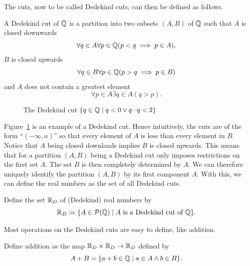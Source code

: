 \documentclass[../main.tex]{subfiles}
\begin{document}
The cuts, now to be called Dedekind cuts, can then be defined as follows.
\begin{definition}
    A Dedekind cut of $\mathbb{Q}$ is a partition into two subsets $(A,B)$ of $\mathbb{Q}$ such that $A$ is closed downwards
    \begin{equation*}
        \forall q\in A\forall p\in\mathbb{Q}(p<q\implies p\in A),
    \end{equation*}
    $B$ is closed upwards
    \begin{equation*}
        \forall q\in B\forall p\in\mathbb{Q}(p>q\implies p\in B)
    \end{equation*}
    and $A$ does not contain a greatest element
    \begin{equation*}
        \forall p\in A\exists q\in A(q>p).
    \end{equation*}
\end{definition}
\begin{figure}[!htbp]
    \centering
    
    \caption{The Dedekind cut $\{q\in\mathbb{Q}\mid q<0\lor q\cdot q<2\}$}
    \label{fig:the_real_numbers:dedekind_cut}
\end{figure}
Figure~\ref{fig:the_real_numbers:dedekind_cut} is an example of a Dedekind cut. Hence intuitively, the cuts are of the form ``$(-\infty,a)$'' so that every element of $A$ is less than every element in $B$. Notice that $A$ being closed downloads implies $B$ is closed upwards. This means that for a partition $(A,B)$ being a Dedekind cut only imposes restrictions on the first set $A$. The set $B$ is then completely determined by $A$. We can therefore uniquely identify the partition $(A,B)$ by its first component $A$. With this, we can define the real numbers as the set of all Dedekind cuts.
\begin{definition}
    Define the set $\mathbb{R}_D$ of (Dedekind) real numbers by
    \begin{equation*}
        \mathbb{R}_D\coloneq\{A\in\mathcal{P}(\mathbb{Q})\mid A\text{ is a Dedekind cut of }\mathbb{Q}\}.
    \end{equation*}
\end{definition}
Most operations on the Dedekind cuts are easy to define, like addition.
\begin{definition}
    Define addition as the map $\mathbb{R}_D\times\mathbb{R}_D\to\mathbb{R}_D$ defined by
    \begin{equation*}
        A+B=\{a+b\in\mathbb{Q}\mid a\in A\land b\in B\}.
    \end{equation*}
\end{definition}
\end{document}
